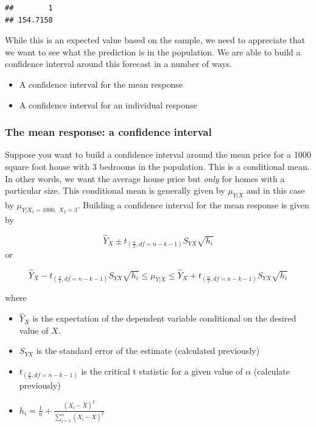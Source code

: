 \documentclass[
]{book}
\begin{document}
\begin{verbatim}
##        1 
## 154.7158
\end{verbatim}

While this is an expected value based on the sample, we need to appreciate that we want to see what the prediction is in the population. We are able to build a confidence interval around this forecast in a number of ways.

\begin{itemize}
\item
  A confidence interval for the mean response
\item
  A confidence interval for an individual response
\end{itemize}

\hypertarget{the-mean-response-a-confidence-interval-1}{%
\subsubsection*{The mean response: a confidence interval}\label{the-mean-response-a-confidence-interval-1}}

Suppose you want to build a confidence interval around the mean price for a 1000 square foot house with 3 bedrooms in the population. This is a conditional mean. In other words, we want the average house price but \emph{only} for homes with a particular size. This conditional mean is generally given by \(\mu_{Y|X}\) and in this case by \(\mu_{Y|X_1=1000,\;X_2=3}\). Building a confidence interval for the mean response is given by

\[ \hat{Y}_{X} \pm t_{(\frac{\alpha}{2},df=n-k-1)}S_{YX} \sqrt{h_i}\]
or

\[ \hat{Y}_{X} - t_{(\frac{\alpha}{2},df=n-k-1)}S_{YX} \sqrt{h_i} \leq \mu_{Y|X} \leq \hat{Y}_{X} + t_{(\frac{\alpha}{2},df=n-k-1)}S_{YX} \sqrt{h_i}\]

where

\begin{itemize}
\item
  \(\hat{Y}_{X}\) is the expectation of the dependent variable conditional on the desired value of \(X\).
\item
  \(S_{YX}\) is the standard error of the estimate (calculated previously)
\item
  \(t_{(\frac{\alpha}{2},df=n-k-1)}\) is the critical t statistic for a given value of \(\alpha\) (calculate previously)
\item
  \(h_i = \frac{1}{n}+\frac{(X_i - \bar{X})^2}{\sum_{i=1}^n(X_i - \bar{X})^2}\)
\end{itemize}
\end{document}

